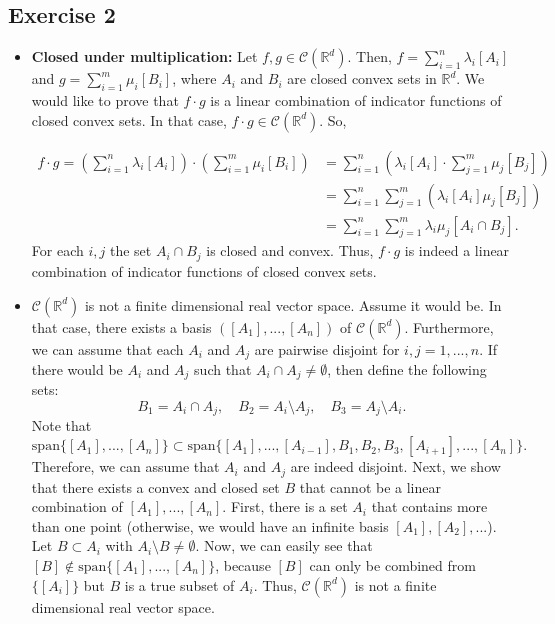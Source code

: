 \documentclass{article}
\begin{document}
\subsection*{Exercise 2}

\begin{itemize}
    \item \textbf{Closed under multiplication:} Let $f,g \in \mathcal C(\mathbb R^d)$. Then, $f = \sum_{i=1}^{n}\lambda_i [A_i]$ and $g = \sum_{i=1}^m \mu_i [B_i]$, where $A_i$ and $B_i$ are closed convex sets in $\mathbb R^d$. We would like to prove that $f \cdot g$ is a linear combination of indicator functions of closed convex sets. In that case, $f \cdot g \in \mathcal C(\mathbb R^d)$. So,
    
    \begin{align*}
        f \cdot g = \left(\sum_{i=1}^{n}\lambda_i [A_i]\right) \cdot \left(\sum_{i=1}^m \mu_i [B_i]\right) &= \sum_{i=1}^{n}\left(\lambda_i[A_i] \cdot  \sum_{j=1}^m \mu_j [B_j] \right) \\
        &= \sum^n_{i=1}\sum^m_{j=1}\left(\lambda_i[A_i]\mu_j[B_j]\right) \\
        &= \sum^n_{i=1}\sum^m_{j=1} \lambda_i\mu_j[A_i \cap B_j].
    \end{align*}
    For each $i,j$ the set $A_i \cap B_j$ is closed and convex. Thus, $f\cdot g$ is indeed a linear combination of indicator functions of closed convex sets.

    \item $\mathcal C(\mathbb R^d)$ is not a finite dimensional real vector space. Assume it would be. In that case, there exists a basis $\left([A_1],...,[A_n]\right)$ of $\mathcal C(\mathbb R^d)$. Furthermore, we can assume that each $A_i$ and $A_j$ are pairwise disjoint for $i,j = 1,...,n$. If there would be $A_i$ and $A_j$ such that $A_i \cap A_j \neq \emptyset$, then define the following sets: 
    $$
        B_1 = A_i \cap A_j, \quad B_{2} = A_i \setminus A_j, \quad B_3 = A_j \setminus A_i.
    $$
    Note that 
    $$
        \mathrm{span}\{[A_1],...,[A_n]\} \subset \mathrm{span}\{[A_1],...,[A_{i-1}],B_1,B_2,B_3,[A_{i+1}],...,[A_n]\}.
    $$
    Therefore, we can assume that $A_i$ and $A_j$ are indeed disjoint. Next, we show that there exists a convex and closed set $B$ that cannot be a linear combination of $[A_1],...,[A_n]$. First, there is a set $A_i$ that contains more than one point (otherwise, we would have an infinite basis $[A_1],[A_2],...$). Let $B \subset A_i$ with $A_i \setminus B \neq \emptyset$. Now, we can easily see that $[B] \notin \mathrm{span}\{[A_1],...,[A_n]\}$, because $[B]$ can only be combined from $\{[A_i]\}$ but $B$ is a true subset of $A_i$. Thus, $\mathcal C(\mathbb R^d)$ is not a finite dimensional real vector space.


\end{itemize}
\end{document}
